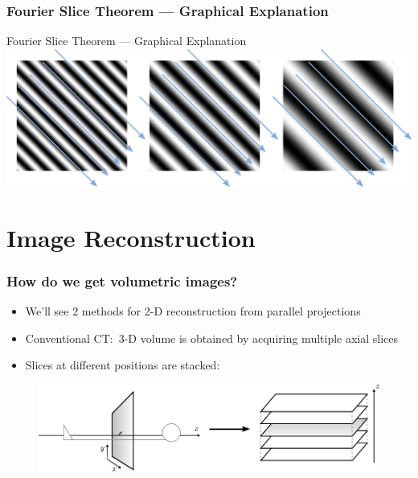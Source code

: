 \begin{frame}
	\frametitle{Fourier Slice Theorem --- Graphical Explanation}
	\centering
	\def\svgwidth{0.55\linewidth}
	

\end{frame}

\begin{frame}[c]{Fourier Slice Theorem --- Graphical Explanation}
	\centering
	\includegraphics[height=0.6\textheight]{images/ProjetionAndFourierTransform}
\end{frame}

\subtitle{Computed Tomography --- Part 2}
\frame[plain,c]{\titlepage}

\section{Image Reconstruction}

\begin{frame}
	\frametitle{How do we get volumetric images?}

	\begin{itemize}
		\item We'll see 2 methods for 2-D reconstruction from parallel projections
		\item Conventional CT:\ 3-D volume is obtained by acquiring multiple axial slices
		\item Slices at different positions are stacked:

	\end{itemize}

	\begin{figure}[tbp]
		\centering
		\includegraphics[width=0.85\linewidth]{images/reco_1}%
		\label{fig:ct_reco_1}
	\end{figure}

\end{frame}

